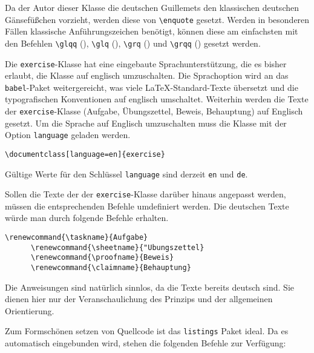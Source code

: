 \documentclass{exercise}
\begin{document}
    Da der Autor dieser Klasse die deutschen Guillemets den klassischen deutschen Gänsefüßchen vorzieht, werden diese von \lstinline-\enquote- gesetzt. Werden in besonderen Fällen klassische Anführungszeichen benötigt, können diese am einfachsten mit den Befehlen \lstinline-\glqq- (\glqq), \lstinline-\glq- (\glq), \lstinline-\grq- (\grq) und \lstinline-\grqq- (\grqq) gesetzt werden.

    Die \texttt{exercise}-Klasse hat eine eingebaute Sprachunterstützung, die es bisher erlaubt, die Klasse auf englisch umzuschalten. Die Sprachoption wird an das \texttt{babel}-Paket \cite{babel} weitergereicht, was viele \LaTeX{}-Standard-Texte übersetzt und die typografischen Konventionen auf englisch umschaltet. Weiterhin werden die Texte der \texttt{exercise}-Klasse (Aufgabe, Übungszettel, Beweis, Behauptung) auf Englisch gesetzt. Um die Sprache auf Englisch umzuschalten muss die Klasse mit der Option \lstinline{language} geladen werden.
    \begin{lstlisting}[gobble=6]
      \documentclass[language=en]{exercise}
    \end{lstlisting}
    Gültige Werte für den Schlüssel \lstinline{language} sind derzeit \lstinline{en} und \lstinline{de}.

    Sollen die Texte der der \texttt{exercise}-Klasse darüber hinaus angepasst werden, müssen die entsprechenden Befehle umdefiniert werden. Die deutschen Texte würde man durch folgende Befehle erhalten.
    \begin{lstlisting}[gobble=6]
      \renewcommand{\taskname}{Aufgabe}
      \renewcommand{\sheetname}{"Ubungszettel}
      \renewcommand{\proofname}{Beweis}
      \renewcommand{\claimname}{Behauptung}
    \end{lstlisting}
    Die Anweisungen sind natürlich sinnlos, da die Texte bereits deutsch sind. Sie dienen hier nur der Veranschaulichung des Prinzips und der allgemeinen Orientierung.


    Zum Formschönen setzen von Quellcode ist das \texttt{listings} Paket
    \cite{listings} ideal. Da es automatisch eingebunden wird, stehen die
    folgenden Befehle zur Verfügung:
\end{document}
